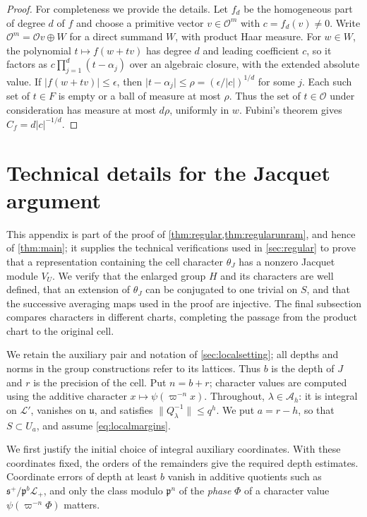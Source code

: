 \documentclass[11pt,reqno]{amsart}
\numberwithin{equation}{section}
\theoremstyle{plain}
\theoremstyle{definition}
\theoremstyle{remark}
\theoremstyle{plain}
\newcommand{\OO}{\mathcal{O}}    %
\newcommand{\pp}{\mathfrak{p}}   %
\newcommand{\Lat}{\mathcal{L}}   %
\newcommand{\g}{\mathfrak{g}}    %
\newcommand{\uu}{\mathfrak{u}}   %
\newcommand{\sS}{\mathfrak{s}^+}   %
\newcommand{\abs}[1]{\lvert#1\rvert}
\newcommand{\norm}[1]{\lVert#1\rVert}
\newcommand{\lf}{\lambda}
\begin{document}
\begin{proof}
For completeness we provide the details.
Let $f_d$ be the homogeneous part of degree $d$ of $f$ and choose a
primitive vector $v\in\OO^m$ with $c=f_d(v)\ne0$. Write
$\OO^m=\OO v\oplus W$ for a direct summand $W$, with product Haar
measure. For $w\in W$, the polynomial $t\mapsto f(w+tv)$ has degree
$d$ and leading coefficient $c$, so it factors as
$c\prod_{j=1}^d(t-\alpha_j)$ over an algebraic closure, with the
extended absolute value. If $\abs{f(w+tv)}\le\epsilon$, then
$\abs{t-\alpha_j}\le\rho=(\epsilon/\abs c)^{1/d}$ for some $j$.
Each such set of $t\in F$ is empty or a ball of measure at most
$\rho$. Thus the set of $t\in\OO$ under consideration has measure
at most $d\rho$, uniformly in $w$. Fubini's theorem gives
$C_f=d\abs c^{-1/d}$.
\end{proof}


\section{Technical details for the Jacquet argument}\label{sec:jacquetdetails}

This appendix is part of the proof of \cref{thm:regular,thm:regularunram}, and hence of
\cref{thm:main}; it supplies the technical verifications used in
\cref{sec:regular} to prove that a representation containing the cell
character $\theta_J$ has a nonzero Jacquet module $V_U$.
We verify that the enlarged group $H$ and its characters are well defined,
that an extension of $\theta_J$ can be conjugated to one trivial on $S$,
and that the successive averaging maps used in the proof are injective.
The final subsection compares characters in different charts,
completing the passage from the product chart to the original cell.

We retain the auxiliary pair and notation of \cref{sec:localsetting};
all depths and norms in the group constructions refer to its lattices.
Thus $b$ is the
depth of $J$ and $r$ is the precision of the cell. Put $n=b+r$;
character values are computed using the additive character
$x\mapsto\psi(\varpi^{-n}x)$. Throughout, $\lf\in\mathcal A_h$:
it is integral on $\Lat'$, vanishes on $\uu$, and satisfies
$\norm{Q_\lf^{-1}}\le q^h$. We put $a=r-h$, so that $S\subset U_a$,
and assume \eqref{eq:localmargins}.

We first justify the initial choice of integral auxiliary coordinates.
With these coordinates fixed, the orders of the remainders give the
required depth estimates.
Coordinate errors of depth at least $b$ vanish in additive quotients
such as $\sS/\pp^b\Lat_+$, and only the class modulo $\pp^n$ of the
\emph{phase} $\Phi$ of a character value $\psi(\varpi^{-n}\Phi)$ matters.
\end{document}

